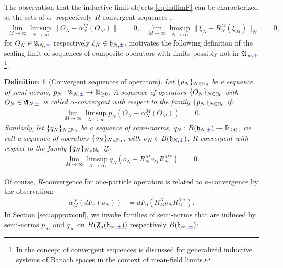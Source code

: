 \documentclass[a4paper, 11pt]{article}
\newcommand{\fA}{\mathfrak{A}}\newcommand{\cA}{\mathcal{A}}\newcommand{\dA}{\mathds{A}}\newcommand{\sA}{\mathscr{A}}
\newcommand{\ua}{\textup a}
\newcommand{\fF}{\mathfrak{F}}\newcommand{\cF}{\mathcal{F}}\newcommand{\dF}{\mathds{F}}\newcommand{\sF}{\mathscr{F}}
\newcommand{\fh}{\mathfrak{h}}
\DeclareMathOperator{\1}{\mathds{1}}
\newtheorem{defn}[thm]{Definition}
\begin{document}
The observation that the inductive-limit objects \eqref{eq:indlimF} can be characterized as the sets of $\alpha$- respectively $R$-convergent sequences \cite{DuffieldMeanFieldDynamical},
\begin{align}
\label{eq:convseq}
\lim_{M\rightarrow\infty}\limsup_{N\rightarrow\infty}\|O_{N}-\alpha^{M}_{N}(O_{M})\| & = 0, & \lim_{M\rightarrow\infty}\limsup_{N\rightarrow\infty}\|\xi_{N}-R^{M}_{N}(\xi_{M})\|_{N} & = 0,
\end{align}
for $O_{N}\in\fA_{N,{\color{blue}\pm}}$ respectively $\xi_{N}\in\fh_{N,{\color{blue}\pm}}$, motivates the following definition of the scaling limit of sequences of composite operators with limits possibly not in $\fA_{\infty,{\color{blue}\pm}}$\footnote{In \cite{DuffieldMeanFieldDynamical} the concept of convergent sequences is discussed for generalized inductive systems of Banach spaces in the context of mean-field limits.}.
\begin{defn}[Convergent sequences of operators]
\label{def:convseq}
Let $\{p_{N}\}_{N\in\mathbb{N}_{0}}$ be a sequence of semi-norms, $p_{N}:\fA_{N,{\color{blue}\pm}}\rightarrow\R_{\geq0}$. A sequence of operators $\{O_{N}\}_{N\in\mathbb{N}_{0}}$ with $O_{N}\in\fA_{N,{\color{blue}\pm}}$ is called $\alpha$-convergent with respect to the family $\{p_{N}\}_{N\in\mathbb{N}_{0}}$ if:
\begin{align*}
\lim_{M\rightarrow\infty}\limsup_{N\rightarrow\infty}p_{N}(O_{N}-\alpha^{M}_{N}(O_{M})) & = 0.
\end{align*}
Similarly, let $\{q_{N}\}_{N\in\mathbb{N}_{0}}$ be a sequence of semi-norms, $q_{N}:B(\fh_{N,{\color{blue}\pm}})\rightarrow\R_{\geq0}$, we call a sequence of operators $\{o_{N}\}_{N\in\mathbb{N}_{0}}$, with $o_{N}\in B(\fh_{N,{\color{blue}\pm}})$, $R$-convergent with respect to the family $\{q_{N}\}_{N\in\mathbb{N}_{0}}$ if:
\begin{align*}
\lim_{M\rightarrow\infty}\limsup_{N\rightarrow\infty}q_{N}(o_{N}-R^{M}_{N}o_{M}R^{M}_{N}{}^{*}) & = 0.
\end{align*}
\end{defn}
Of course, $R$-convergence for one-particle operators is related to $\alpha$-convergence by the observation:
\begin{align}
\label{eq:Ralpha}
\alpha^{N}_{M}(dF_{0}(o_{N})) & = dF_{0}(R^{N}_{M}o_{N}R^{N}_{M}{}^{*}).
\end{align}
In Section \ref{sec:approxconf}, we invoke families of semi-norms that are induced by semi-norms $p_{\infty}$ and $q_{\infty}$ on $B(\fF_{\ua}(\fh_{\infty,{\color{blue}\pm}}))$ respectively $B(\fh_{\infty,{\color{blue}\pm}})$:
\end{document}
